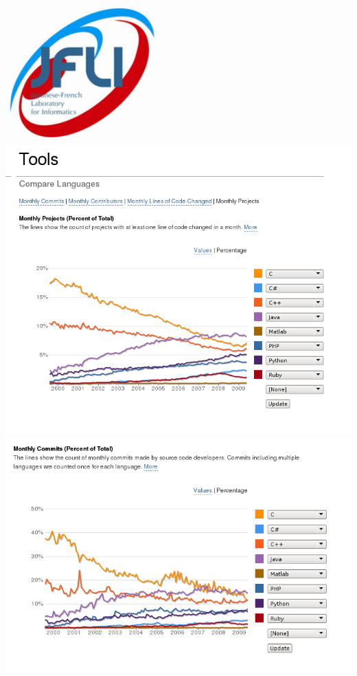 \documentclass{report}
\begin{document}
\includegraphics[width=6cm]{logo_jfli.png}
\clearpage%
\includegraphics[width=\textwidth]{pythonohloh4.png}
\clearpage%
\includegraphics[width=\textwidth]{pythonohloh.png}
\clearpage%
\end{document}
